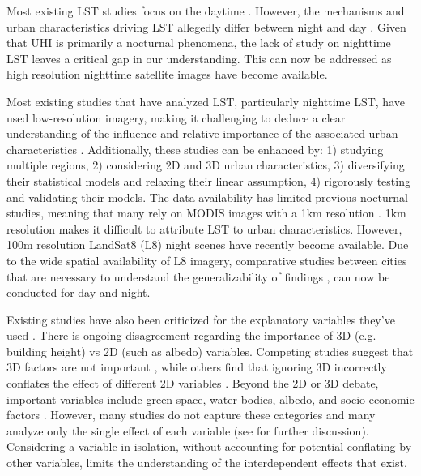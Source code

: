 \documentclass[review]{elsarticle}
\begin{document}
Most existing LST studies focus on the daytime \cite{Peng2018-cp,Chun2018-so,Wang2019-water,Zhou2018-iy}.
However, the mechanisms and urban characteristics driving LST allegedly differ between night and day \cite{Hung2006-qy, Chun2017-mm, Nichol2005-mm, Wicki2017-fv, Echevarria_Icaza2016-fr,Sobstyl2018-wt, Peng2012-iy, Zhou2014-wc, Zhao2017-cc}. 
Given that UHI is primarily a nocturnal phenomena, the lack of study on nighttime LST leaves a critical gap in our understanding. 
This can now be addressed as high resolution nighttime satellite images have become available.

Most existing studies that have analyzed LST, particularly nighttime LST, have used low-resolution imagery, making it challenging to deduce a clear understanding of the influence and relative importance of the associated urban characteristics \cite{Chun2017-mm, Echevarria_Icaza2016-fr, Wicki2017-fv, Zhou2014-wc}. 
Additionally, these studies can be enhanced by: 1) studying multiple regions, 2) considering 2D and 3D urban characteristics, 3) diversifying their statistical models and relaxing their linear assumption, 4) rigorously testing and validating their models.
The data availability has limited previous nocturnal studies, meaning that many rely on MODIS images with a 1km resolution \cite{Zhou2014-wc, Echevarria_Icaza2016-fr,Wang2019-tree,Peng2012-iy}.
1km resolution makes it difficult to attribute LST to urban characteristics.
However, 100m resolution LandSat8 (L8) night scenes have recently become available. 
Due to the wide spatial availability of L8 imagery, comparative studies between cities that are necessary to understand the generalizability of findings \cite{Peng2012-iy, Hung2006-qy}, can now be conducted for day and night.

Existing studies have also been criticized for the explanatory variables they've used \cite{Chun2017-mm,Peng2018-cp}.
There is ongoing disagreement regarding the importance of 3D (e.g. building height) vs 2D (such as albedo) variables.  
Competing studies suggest that 3D factors are not important \cite{Berger2017-lx}, while others find that ignoring 3D incorrectly conflates the effect of different 2D variables \cite{Chun2017-mm}.
Beyond the 2D or 3D debate, important variables include green space, water bodies, albedo, and socio-economic factors \cite{Peng2018-cp}. 
However, many studies do not capture these categories and many analyze only the single effect of each variable \cite{Zhao2017-cc, Merbitz2012-xz, Unger2004-ry} (see \cite{Peng2018-cp, Chun2017-mm} for further discussion). 
Considering a variable in isolation, without accounting for potential conflating by other variables, limits the understanding of the interdependent effects that exist.
\end{document}
